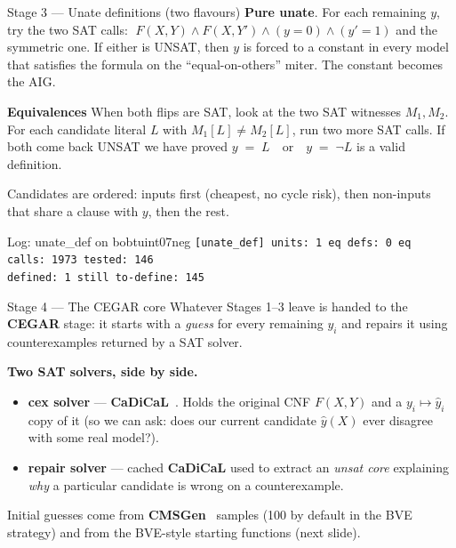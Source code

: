 \documentclass[aspectratio=169]{beamer}
\begin{document}
\begin{frame}{Stage 3 --- Unate definitions (two flavours)}
  \textbf{Pure unate}.
  For each remaining $y$, try the two SAT calls:
  $\;F(X,Y) \wedge F(X,Y') \wedge (y = 0) \wedge (y' = 1)$
  and the symmetric one. If either is UNSAT, then $y$ is forced to a
  \alert{constant} in every model that satisfies the formula on the
  ``equal-on-others'' miter. The constant becomes the AIG.
  \medskip

  \textbf{Equivalences}
  When both flips are SAT, look at the two SAT witnesses $M_1, M_2$.
  For each candidate literal $L$ with $M_1[L] \neq M_2[L]$, run two
  more SAT calls. If both come back UNSAT we have proved
  $ y \;=\; L \quad\text{or}\quad y \;=\; \neg L$ is a valid definition.
  \smallskip

  Candidates are ordered: inputs
  first (cheapest, no cycle risk), then non-inputs that share a clause
  with $y$, then the rest.
  \medskip

  \begin{exampleblock}{\small Log: unate\_def on bobtuint07neg}
  \scriptsize
  \texttt{[unate\_def] units: 1 eq defs: 0 eq calls: 1973
   tested: 146\\
   defined: 1 still to-define: 145}
  \end{exampleblock}
  \medskip
\end{frame}

\begin{frame}{Stage 4 --- The CEGAR core}
  Whatever Stages 1--3 leave is handed to the \textbf{CEGAR} stage: it
  starts with a \emph{guess} for every remaining
  $y_i$ and \alert{repairs} it using counterexamples returned by a SAT solver.
  \medskip

  \textbf{Two SAT solvers, side by side.}
  \begin{itemize}\setlength{\itemsep}{1pt}
    \item \textbf{cex solver} ---
          \textbf{CaDiCaL}~\cite{biere2019cadical}. Holds the original CNF
          $F(X,Y)$ \alert{and} a $y_i \mapsto \hat y_i$ copy of it (so we
          can ask: does our current candidate $\hat y(X)$ ever disagree
          with some real model?).
    \item \textbf{repair solver} --- cached \textbf{CaDiCaL} used to
          extract an \emph{unsat core} explaining \emph{why} a particular
          candidate is wrong on a counterexample.
  \end{itemize}
  \medskip

  Initial guesses come from \textbf{CMSGen}~\cite{golia2021cmsgen} samples
  (100 by default in the BVE strategy) and from the BVE-style
  starting functions (next slide).
\end{frame}
\end{document}
